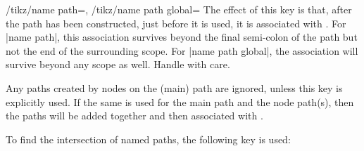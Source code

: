 \begin{keylist}{%
    /tikz/name path=,
    /tikz/name path global=%
}
    The effect of this key is that, after the path has been constructed, just
    before it is used, it is associated with . For |name path|, this
    association survives beyond the final semi-colon of the path but not the
    end of the surrounding scope. For |name path global|, the association will
    survive beyond any scope as well. Handle with care.

    Any paths created by nodes on the (main) path are ignored, unless this key
    is explicitly used. If the same  is used for the main path and
    the node path(s), then the paths will be added together and then associated
    with .
\end{keylist}

To find the intersection of named paths, the following key is used:


